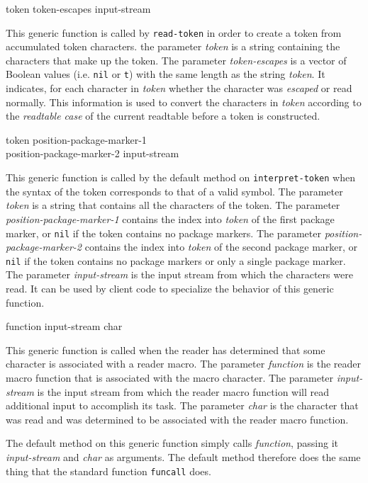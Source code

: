  {token token-escapes input-stream}

This generic function is called by \texttt{read-token} in order to
create a token from accumulated token characters.  the parameter
\textit{token} is a string containing the characters that make up the
token.  The parameter \textit{token-escapes} is a vector of Boolean
values (i.e. \texttt{nil} or \texttt{t}) with the same length as the
string \textit{token}.  It indicates, for each character in
\textit{token} whether the character was \emph{escaped} or read
normally.  This information is used to convert the characters in
\textit{token} according to the \emph{readtable case} of the current
readtable before a token is constructed.

 {token position-package-marker-1\\
  position-package-marker-2 input-stream}

This generic function is called by the default method on
\texttt{interpret-token} when the syntax of the token corresponds to
that of a valid symbol.  The parameter \textit{token} is a string that
contains all the characters of the token.  The parameter
\textit{position-package-marker-1} contains the index into
\textit{token} of the first package marker, or \texttt{nil} if the
token contains no package markers.  The parameter
\textit{position-package-marker-2} contains the index into
\textit{token} of the second package marker, or \texttt{nil} if the
token contains no package markers or only a single package marker.
The parameter \textit{input-stream} is the input stream from which the
characters were read.  It can be used by client code to specialize the
behavior of this generic function.

 {function input-stream char}

This generic function is called when the reader has determined that
some character is associated with a reader macro.  The parameter
\textit{function} is the reader macro function that is associated with
the macro character.  The parameter \textit{input-stream} is the input
stream from which the reader macro function will read additional input
to accomplish its task.  The parameter \textit{char} is the character
that was read and was determined to be associated with the reader
macro function.

The default method on this generic function simply calls
\textit{function}, passing it \textit{input-stream} and \textit{char}
as arguments.  The default method therefore does the same thing that
the standard \commonlisp{} function \texttt{funcall} does.

